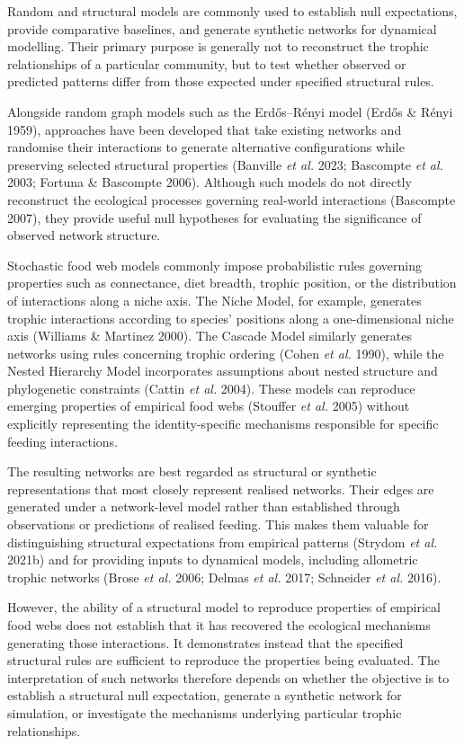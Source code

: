 \documentclass[
]{article}
\begin{document}
Random and structural models are commonly used to establish null
expectations, provide comparative baselines, and generate synthetic
networks for dynamical modelling. Their primary purpose is generally not
to reconstruct the trophic relationships of a particular community, but
to test whether observed or predicted patterns differ from those
expected under specified structural rules.

Alongside random graph models such as the Erdős--Rényi model (Erdős \&
Rényi 1959), approaches have been developed that take existing networks
and randomise their interactions to generate alternative configurations
while preserving selected structural properties (Banville \emph{et al.}
2023; Bascompte \emph{et al.} 2003; Fortuna \& Bascompte 2006). Although
such models do not directly reconstruct the ecological processes
governing real-world interactions (Bascompte 2007), they provide useful
null hypotheses for evaluating the significance of observed network
structure.

Stochastic food web models commonly impose probabilistic rules governing
properties such as connectance, diet breadth, trophic position, or the
distribution of interactions along a niche axis. The Niche Model, for
example, generates trophic interactions according to species' positions
along a one-dimensional niche axis (Williams \& Martinez 2000). The
Cascade Model similarly generates networks using rules concerning
trophic ordering (Cohen \emph{et al.} 1990), while the Nested Hierarchy
Model incorporates assumptions about nested structure and phylogenetic
constraints (Cattin \emph{et al.} 2004). These models can reproduce
emerging properties of empirical food webs (Stouffer \emph{et al.} 2005)
without explicitly representing the identity-specific mechanisms
responsible for specific feeding interactions.

The resulting networks are best regarded as structural or synthetic
representations that most closely represent realised networks. Their
edges are generated under a network-level model rather than established
through observations or predictions of realised feeding. This makes them
valuable for distinguishing structural expectations from empirical
patterns (Strydom \emph{et al.} 2021b) and for providing inputs to
dynamical models, including allometric trophic networks (Brose \emph{et
al.} 2006; Delmas \emph{et al.} 2017; Schneider \emph{et al.} 2016).

However, the ability of a structural model to reproduce properties of
empirical food webs does not establish that it has recovered the
ecological mechanisms generating those interactions. It demonstrates
instead that the specified structural rules are sufficient to reproduce
the properties being evaluated. The interpretation of such networks
therefore depends on whether the objective is to establish a structural
null expectation, generate a synthetic network for simulation, or
investigate the mechanisms underlying particular trophic relationships.
\end{document}
